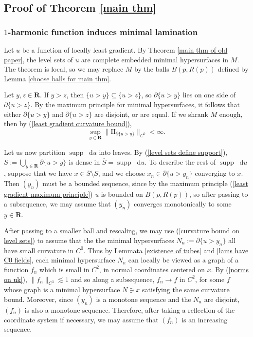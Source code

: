 \documentclass[reqno,11pt]{amsart}
\newcommand{\RR}{\mathbf{R}}
\newcommand*\dif{\mathop{}\!\mathrm{d}}
\DeclareMathOperator{\supp}{supp}
\newcommand{\Two}{\mathrm{I\!I}}
\theoremstyle{definition}
\numberwithin{equation}{section}
\begin{document}
\subsection{Proof of Theorem \texorpdfstring{\ref{main thm}}{C}}
\subsubsection{\texorpdfstring{$1$-harmonic}{One-harmonic} function induces minimal lamination}
Let $u$ be a function of locally least gradient.
By Theorem \ref{main thm of old paper}, the level sets of $u$ are complete embedded minimal hypersurfaces in $M$.
The theorem is local, so we may replace $M$ by the balls $B(p, R(p))$ defined by Lemma \ref{choose balls for main thm}. 

Let $y, z \in \RR$. If $y > z$, then $\{u > y\} \subseteq \{u > z\}$, so $\partial \{u > y\}$ lies on one side of $\partial \{u > z\}$.
By the maximum principle for minimal hypersurfaces, it follows that either $\partial \{u > y\}$ and $\partial \{u > z\}$ are disjoint, or are equal.
If we shrank $M$ enough, then by (\ref{least gradient curvature bound}),
\begin{equation}\label{curvature bound on level sets}
\sup_{y \in \RR} \|\Two_{\partial \{u > y\}}\|_{C^0} < \infty.
\end{equation}

Let us now partition $\supp \dif u$ into leaves. 
By (\ref{level sets define support}), $S := \bigcup_{y \in \RR} \partial \{u > y\}$ is dense in $\overline S = \supp \dif u$.
To describe the rest of $\supp \dif u$, suppose that we have $x \in \overline S \setminus S$, and we choose $x_n \in \partial \{u > y_n\}$ converging to $x$.
Then $(y_n)$ must be a bounded sequence, since by the maximum principle (\ref{least gradient maximum principle}) $u$ is bounded on $B(p, R(p))$, so after passing to a subsequence, we may assume that $(y_n)$ converges monotonically to some $y \in \RR$.

After passing to a smaller ball and rescaling, we may use (\ref{curvature bound on level sets}) to assume that the the minimal hypersurfaces $N_n := \partial \{u > y_n\}$ all have small curvature in $C^0$.
Thus by Lemmata \ref{existence of tubes} and \ref{lams have C0 fields}, each minimal hypersurface $N_n$ can locally be viewed as a graph of a function $f_n$ which is small in $C^2$, in normal coordinates centered on $x$.
By (\ref{norms on uk}), $\|f_n\|_{C^3} \lesssim 1$ and so along a subsequence, $f_n \to f$ in $C^2$, for some $f$ whose graph is a minimal hypersurface $N \ni x$ satisfying the same curvature bound.
Moreover, since $(y_n)$ is a monotone sequence and the $N_n$ are disjoint, $(f_n)$ is also a monotone sequence.
Therefore, after taking a reflection of the coordinate system if necessary, we may assume that $(f_n)$ is an increasing sequence.
\end{document}
